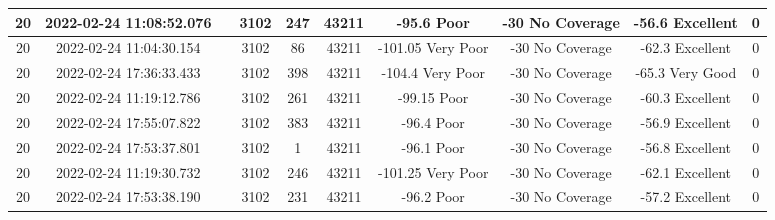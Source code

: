 \begin{longtable*}{|c|c|c|c|c|c|c|c|c|c|}
20&2022-02-24 11:08:52.076&&3102&247&43211& -95.6     Poor        & -30       No Coverage & -56.6     Excellent   & 0\\\hline
{}20&2022-02-24 11:04:30.154&&3102&86&43211& -101.05   Very Poor   & -30       No Coverage & -62.3     Excellent   & 0\\\hline
{}20&2022-02-24 17:36:33.433&&3102&398&43211& -104.4    Very Poor   & -30       No Coverage & -65.3     Very Good   & 0\\\hline
{}20&2022-02-24 11:19:12.786&&3102&261&43211& -99.15    Poor        & -30       No Coverage & -60.3     Excellent   & 0\\\hline
{}20&2022-02-24 17:55:07.822&&3102&383&43211& -96.4     Poor        & -30       No Coverage & -56.9     Excellent   & 0\\\hline
{}20&2022-02-24 17:53:37.801&&3102&1&43211& -96.1     Poor        & -30       No Coverage & -56.8     Excellent   & 0\\\hline
{}20&2022-02-24 11:19:30.732&&3102&246&43211& -101.25   Very Poor   & -30       No Coverage & -62.1     Excellent   & 0\\\hline
{}20&2022-02-24 17:53:38.190&&3102&231&43211& -96.2     Poor        & -30       No Coverage & -57.2     Excellent   & 0\\\hline

\end{longtable*}
